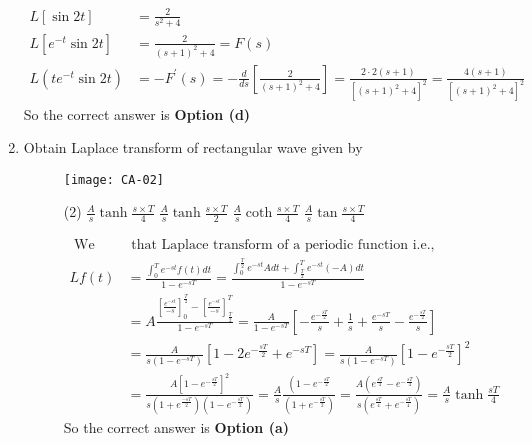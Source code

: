 \begin{enumerate}
\begin{answer}
	$$
	\begin{aligned}
	L[\sin 2 t]&=\frac{2}{s^{2}+4}\\
	L\left[e^{-t} \sin 2 t\right]&=\frac{2}{(s+1)^{2}+4}=F(s)\\
	L\left(t e^{-t} \sin 2 t\right)&=-F^{\prime}(s)=-\frac{d}{d s}\left[\frac{2}{(s+1)^{2}+4}\right]=\frac{2 \cdot 2(s+1)}{\left[(s+1)^{2}+4\right]^{2}}=\frac{4(s+1)}{\left[(s+1)^{2}+4\right]^{2}}
\end{aligned}
$$
	So the correct answer is \textbf{Option (d)}
\end{answer}
\item Obtain Laplace transform of rectangular wave given by
\begin{figure}[H]
	\centering
	\texttt{[image: CA-02]}
	 \begin{tasks}(2)
		\task[\textbf{a.}]$\frac{A}{s}\tanh\frac{s\times T}{4}$
		\task[\textbf{b.}]$\frac{A}{s}\tanh\frac{s\times T}{2}$
		\task[\textbf{c.}]$\frac{A}{s}\coth\frac{s\times T}{4}$
		\task[\textbf{d.}] $\frac{A}{s}\tan\frac{s\times T}{4}$
	\end{tasks}
\begin{answer}
	$$
	\begin{aligned}
	\text { We know}&\text{ that Laplace transform of a periodic function i.e., }\\
	L f(t)&=\frac{\int_{0}^{T} e^{-s t} f(t) d t}{1-e^{-s T}}=\frac{\int_{0}^{\frac{T}{2}} e^{-s t} A d t+\int_{\frac{T}{2}}^{T} e^{-s t}(-A) d t}{1-e^{-s T}}\\
	&=A \frac{\left[\frac{e^{-s t}}{-s}\right]_{0}^{\frac{T}{2}}-\left[\frac{e^{-s t}}{-s}\right]_{\frac{T}{2}}^{T}}{1-e^{-s T}}=\frac{A}{1-e^{-s T}}\left[-\frac{e^{-\frac{s T}{2}}}{s}+\frac{1}{s}+\frac{e^{-s T}}{s}-\frac{e^{-\frac{s T}{2}}}{s}\right]\\
	&=\frac{A}{s\left(1-e^{-s T}\right)}\left[1-2 e^{-\frac{s T}{2}}+e^{-s T}\right]=\frac{A}{s\left(1-e^{-s T}\right)}\left[1-e^{-\frac{s T}{2}}\right]^{2}\\
	&=\frac{A\left[1-e^{-\frac{s T}{2}}\right]^{2}}{s\left(1+e^{\frac{-s T}{2}}\right)\left(1-e^{-\frac{s T}{2}}\right)}=\frac{A}{s} \frac{\left(1-e^{-\frac{s T}{2}}\right.}{\left(1+e^{-\frac{s T}{2}}\right)}=\frac{A\left(e^{\frac{s T}{4}}-e^{-\frac{s T}{4}}\right)}{s\left(e^{\frac{s T}{4}}+e^{-\frac{s T}{4}}\right)}=\frac{A}{s} \tanh \frac{s T}{4}
\end{aligned}
$$
	So the correct answer is \textbf{Option (a)}
\end{answer}
\end{figure}

\end{enumerate}
